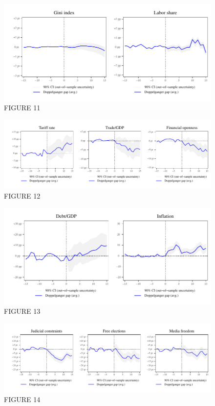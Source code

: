 \documentclass{article}
\begin{document}
\clearpage

\begin{figure}	
	\caption{FIGURE 11} 
		\includegraphics[scale=0.8]{Figure11}\centering	
\end{figure}

\clearpage

\begin{figure}	
	\caption{FIGURE 12} 
		\includegraphics[scale=0.8]{Figure12}\centering	
\end{figure}

\clearpage

\begin{figure}	
	\caption{FIGURE 13} 
		\includegraphics[scale=0.8]{Figure13}\centering	
\end{figure}

\clearpage

\begin{figure}	
	\caption{FIGURE 14} 
		\includegraphics[scale=0.8]{Figure14}\centering	
\end{figure}
\end{document}
